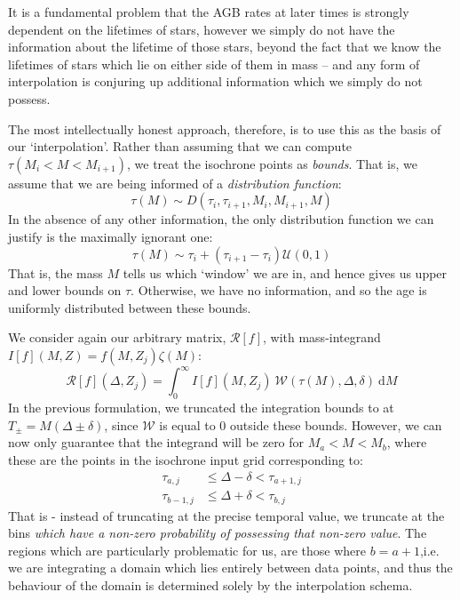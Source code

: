 \documentclass[a4paper,11pt]{article}
\def\d{\mathrm d}
\begin{document}
		It is a fundamental problem that the AGB rates at later times is strongly dependent on the lifetimes of stars, however we simply do not have the information about the lifetime of those stars, beyond the fact that we know the lifetimes of stars which lie on either side of them in mass -- and any form of interpolation is conjuring up additional information which we simply do not possess. 

		The most intellectually honest approach, therefore, is to use this as the basis of our `interpolation'. Rather than assuming that we can compute $\tau(M_i < M < M_{i+1})$, we treat the isochrone points as \textit{bounds}. That is, we assume that we are being informed of a \textit{distribution function}:
		\begin{equation}
			\tau(M) \sim  D(\tau_{i},\tau_{i+1},M_{i},M_{i+1},M)
		\end{equation}
		In the absence of any other information, the only distribution function we can justify is the maximally ignorant one:
		\begin{equation}
			\tau(M) \sim \tau_i + (\tau_{i+1} - \tau_i) \mathcal{U}(0,1)
		\end{equation}
		That is, the mass $M$ tells us which `window' we are in, and hence gives us upper and lower bounds on $\tau$. Otherwise, we have no information, and so the age is uniformly distributed between these bounds.

		We consider again our arbitrary matrix, $\mathcal{R}[f]$, with mass-integrand $I[f](M,Z) = f(M,Z_j) \zeta(M)$:
			\begin{equation}
				\mathcal{R}[f](\Delta,Z_j) = \int_0^\infty I[f](M,Z_j) ~\mathcal{W}(\tau(M),\Delta,\delta)~\d M
			\end{equation}
			In the previous formulation, we truncated the integration bounds to at $T_\pm = M(\Delta \pm \delta)$, since $\mathcal{W}$ is equal to 0 outside these bounds. However, we can now only guarantee that the integrand will be zero for $M_a < M < M_b $, where these are the points in the isochrone input grid corresponding to:
			\begin{align}
				\tau_{a,j} &\leq \Delta - \delta < \tau_{a+1,j}
				\\
				\tau_{b-1,j} & \leq \Delta + \delta < \tau_{b,j}
			\end{align}
			That is - instead of truncating at the precise temporal value, we truncate at the bins \textit{which have a non-zero probability of possessing that non-zero value}. The regions which are particularly problematic for us, are those where $b = a+1$,i.e. we are integrating a domain which lies entirely between data points, and thus the behaviour of the domain is determined solely by the interpolation schema.
\end{document}
